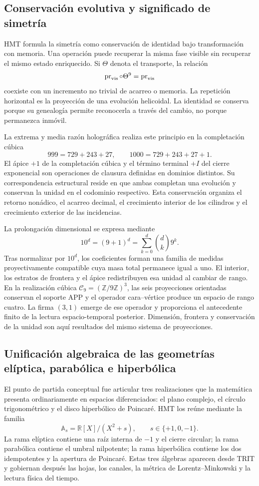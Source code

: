 \subsection*{Conservación evolutiva y significado de simetría}

HMT formula la simetría como conservación de identidad bajo transformación
con memoria. Una operación puede recuperar la misma fase visible sin
recuperar el mismo estado enriquecido. Si \(\Theta\) denota el transporte,
la relación
\[
 \operatorname{pr}_{\rm vis}\circ\Theta^9
 =\operatorname{pr}_{\rm vis}
\]
coexiste con un incremento no trivial de acarreo o memoria. La repetición
horizontal es la proyección de una evolución helicoidal. La identidad se
conserva porque su genealogía permite reconocerla a través del cambio, no
porque permanezca inmóvil.

La extrema y media razón holográfica realiza este principio en la
completación cúbica
\[
 999=729+243+27,\qquad
 1000=729+243+27+1.
\]
El ápice \(+1\) de la completación cúbica y el término terminal \(+I\) del
cierre exponencial son operaciones de clausura definidas en dominios
distintos. Su correspondencia estructural reside en que ambas completan una
evolución y conservan la unidad en el codominio respectivo. Esta conservación
organiza el retorno nonádico, el acarreo decimal, el crecimiento interior de
los cilindros y el crecimiento exterior de las incidencias.

La prolongación dimensional se expresa mediante
\[
 10^d=(9+1)^d=\sum_{k=0}^{d}\binom dk9^k.
\]
Tras normalizar por \(10^d\), los coeficientes forman una familia de medidas
proyectivamente compatible cuya masa total permanece igual a uno. El
interior, los estratos de frontera y el ápice redistribuyen esa unidad al
cambiar de rango. En la realización cúbica
\(\mathcal C_9=(\mathbb Z/9\mathbb Z)^3\), las seis proyecciones orientadas
conservan el soporte APP y el operador cara--vértice produce un espacio de
rango cuatro. La firma \((3,1)\) emerge de ese operador y proporciona el
antecedente finito de la lectura espacio-temporal posterior. Dimensión,
frontera y conservación de la unidad son aquí resultados del mismo sistema
de proyecciones.

\subsection*{Unificación algebraica de las geometrías elíptica, parabólica e hiperbólica}

El punto de partida conceptual fue articular tres realizaciones que la
matemática presenta ordinariamente en espacios diferenciados: el plano
complejo, el círculo trigonométrico y el disco hiperbólico de Poincaré. HMT
los reúne mediante la familia
\[
 \mathbb A_s=\mathbb R[X]/(X^2+s),
 \qquad s\in\{+1,0,-1\}.
\]
La rama elíptica contiene una raíz interna de \(-1\) y el cierre circular; la
rama parabólica contiene el umbral nilpotente; la rama hiperbólica contiene
los dos idempotentes y la apertura de Poincaré. Estas tres álgebras aparecen
desde TRIT y gobiernan después las hojas, los canales, la métrica de
Lorentz--Minkowski y la lectura física del tiempo.

